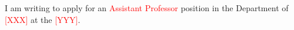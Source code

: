 \documentclass{article}
\newcommand{\fixme}[1]{\textcolor{red}{#1}}
\begin{document}







I am writing to apply for an \fixme{Assistant Professor} position in the Department of \fixme{[XXX]} at the \fixme{[YYY]}.
\end{document}
